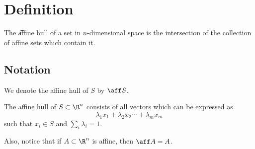 
\section*{Definition}

The \t{affine hull} of a set in $n$-dimensional space is the intersection of the collection of affine sets which contain it.

\subsection*{Notation}

We denote the affine hull of $S$ by $\aff S$.

\begin{proposition}
The affine hull of $S \subset \R ^n$ consists of all vectors which can be expressed as
\[
\lambda _1 x_1 + \lambda _2 x_2 \cdots + \lambda _m x_m
\]
such that $x_i \in S$ and $\sum_i \lambda _i = 1$.
\end{proposition}

Also, notice that if $A \subset \R ^n$ is affine, then $\aff A = A$.

\blankpage
